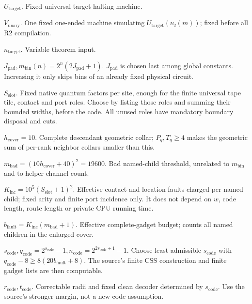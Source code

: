 \noindent\textbf{\(U_{\mathrm{target}}\)}. Fixed universal target halting machine.\par\smallskip
\noindent\textbf{\(V_{\mathrm{unary}}\)}. One fixed one-ended machine simulating \(U_{\mathrm{target}}(\nu_{2}(m))\); fixed before all R2 compilation.\par\smallskip
\noindent\textbf{\(n_{\mathrm{target}}\)}. Variable theorem input.\par\smallskip
\noindent\textbf{\(J_{\mathrm{pad}}, m_{\mathrm{bin}}(n)=2^{n}(2J_{\mathrm{pad}}+1)\)}. \(J_{\mathrm{pad}}\) is chosen last among global constants. Increasing it only skips bins of an already fixed physical circuit.\par\smallskip
\noindent\textbf{\(S_{\mathrm{slot}}\)}. Fixed native quantum factors per site, enough for the finite universal tape tile, contact and port roles. Choose by listing those roles and summing their bounded widths, before the code. All unused roles have mandatory boundary disposal and cuts.\par\smallskip
\noindent\textbf{\(h_{\mathrm{cover}}=10\)}. Complete descendant geometric collar; \(P_{q},T_{q}\ge 4\) makes the geometric sum of per-rank neighbor collars smaller than this.\par\smallskip
\noindent\textbf{\(m_{\mathrm{bad}}=(10h_{\mathrm{cover}}+40)^{2}=19600\)}. Bad named-child threshold, unrelated to \(m_{\mathrm{bin}}\) and to helper channel count.\par\smallskip
\noindent\textbf{\(K_{\mathrm{inc}}=10^{5}(S_{\mathrm{slot}}+1)^{2}\)}. Effective contact and location faults charged per named child; fixed arity and finite port incidence only. It does not depend on \(w\), code length, route length or private CPU running time.\par\smallskip
\noindent\textbf{\(b_{\mathrm{fault}}=K_{\mathrm{inc}}(m_{\mathrm{bad}}+1)\)}. Effective complete-gadget budget; counts all named children in the enlarged cover.\par\smallskip
\noindent\textbf{\(s_{\mathrm{code}}, q_{\mathrm{code}}=2^{s_{\mathrm{code}}}-1, n_{\mathrm{code}}=2^{2s_{\mathrm{code}}+1}-1\)}. Choose least admissible \(s_{\mathrm{code}}\) with \(q_{\mathrm{code}}-8\ge 8(20b_{\mathrm{fault}}+8)\). The source's finite CSS construction and finite gadget lists are then computable.\par\smallskip
\noindent\textbf{\(r_{\mathrm{code}}, t_{\mathrm{code}}\)}. Correctable radii and fixed clean decoder determined by \(s_{\mathrm{code}}\). Use the source's stronger margin, not a new code assumption.\par\smallskip
